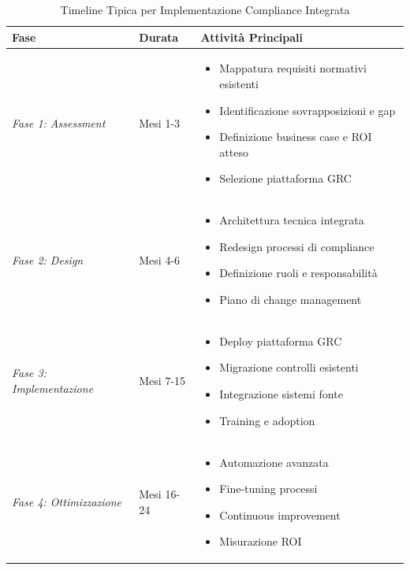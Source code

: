 \begin{table}[htbp]
\centering
\caption{Timeline Tipica per Implementazione Compliance Integrata}
\label{tab:timeline}
\begin{tabular}{l l p{8cm}}
\toprule
\textbf{Fase} & \textbf{Durata} & \textbf{Attività Principali} \\
\midrule
\textit{Fase 1: Assessment} & Mesi 1-3 & 
\begin{itemize}[leftmargin=*, topsep=0pt, itemsep=0pt]
\item Mappatura requisiti normativi esistenti
\item Identificazione sovrapposizioni e gap
\item Definizione business case e ROI atteso
\item Selezione piattaforma GRC
\end{itemize} \\
\midrule
\textit{Fase 2: Design} & Mesi 4-6 & 
\begin{itemize}[leftmargin=*, topsep=0pt, itemsep=0pt]
\item Architettura tecnica integrata
\item Redesign processi di compliance
\item Definizione ruoli e responsabilità
\item Piano di change management
\end{itemize} \\
\midrule
\textit{Fase 3: Implementazione} & Mesi 7-15 & 
\begin{itemize}[leftmargin=*, topsep=0pt, itemsep=0pt]
\item Deploy piattaforma GRC
\item Migrazione controlli esistenti
\item Integrazione sistemi fonte
\item Training e adoption
\end{itemize} \\
\midrule
\textit{Fase 4: Ottimizzazione} & Mesi 16-24 & 
\begin{itemize}[leftmargin=*, topsep=0pt, itemsep=0pt]
\item Automazione avanzata
\item Fine-tuning processi
\item Continuous improvement
\item Misurazione ROI
\end{itemize} \\
\bottomrule
\end{tabular}
\end{table}

\printbibliography[
    heading=subbibintoc,
    title={Riferimenti Bibliografici}
]